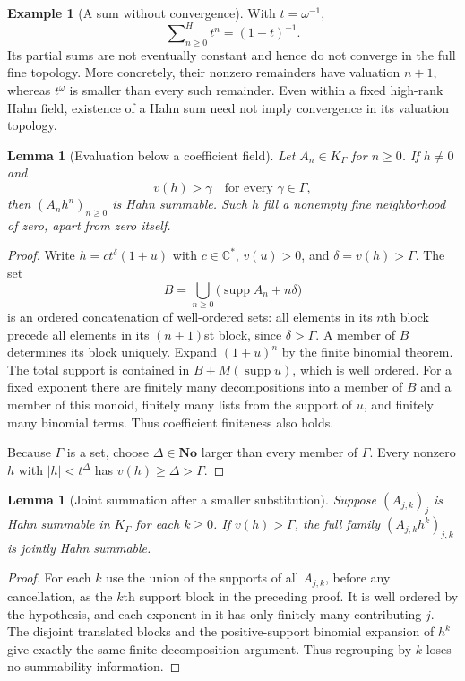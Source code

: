 \documentclass[11pt,a4paper]{article}
\newtheorem{lemma}[theorem]{Lemma}
\theoremstyle{definition}
\newtheorem{example}[theorem]{Example}
\theoremstyle{remark}
\newcommand{\No}{\mathbf{No}}
\newcommand{\C}{\mathbb C}
\newcommand{\supp}{\operatorname{supp}}
\newcommand{\Hs}{\mathop{\sum}\nolimits^{\!H}}
\begin{document}
\begin{example}[A sum without convergence]
With $t=\omega^{-1}$,
\[
 \Hs_{n\ge0}t^n=(1-t)^{-1}.
\]
Its partial sums are not eventually constant and hence do not converge
in the full fine topology. More concretely, their nonzero remainders
have valuation $n+1$, whereas $t^\omega$ is smaller than every such
remainder. Even within a fixed high-rank Hahn field, existence of a
Hahn sum need not imply convergence in its valuation topology.
\end{example}

\begin{lemma}[Evaluation below a coefficient field]\label{lem:ultrasmall}
Let $A_n\in K_\Gamma$ for $n\ge0$. If $h\ne0$ and
\[
 v(h)>\gamma\quad\text{for every }\gamma\in\Gamma,
\]
then $(A_nh^n)_{n\ge0}$ is Hahn summable. Such $h$ fill a nonempty
fine neighborhood of zero, apart from zero itself.
\end{lemma}
\begin{proof}
Write $h=c t^\delta(1+u)$ with $c\in\C^*$, $v(u)>0$, and
$\delta=v(h)>\Gamma$. The set
\[
 B=\bigcup_{n\ge0}\bigl(\supp A_n+n\delta\bigr)
\]
is an ordered concatenation of well-ordered sets: all elements in its
$n$th block precede all elements in its $(n+1)$st block, since
$\delta>\Gamma$. A member of $B$ determines its block uniquely.
Expand $(1+u)^n$ by the finite binomial theorem. The total support is
contained in $B+M(\supp u)$, which is well ordered. For a fixed
exponent there are finitely many decompositions into a member of $B$
and a member of this monoid, finitely many lists from the support of
$u$, and finitely many binomial terms. Thus coefficient finiteness
also holds.

Because $\Gamma$ is a set, choose $\Delta\in\No$ larger than every
member of $\Gamma$. Every nonzero $h$ with $|h|<t^\Delta$ has
$v(h)\ge\Delta>\Gamma$.
\end{proof}
\begin{lemma}[Joint summation after a smaller substitution]\label{lem:jointsmall}
Suppose $(A_{j,k})_j$ is Hahn summable in $K_\Gamma$ for each
$k\ge0$. If $v(h)>\Gamma$, the full family
$(A_{j,k}h^k)_{j,k}$ is jointly Hahn summable.
\end{lemma}
\begin{proof}
For each $k$ use the union of the supports of all $A_{j,k}$, before
any cancellation, as the $k$th support block in the preceding proof.
It is well ordered by the hypothesis, and each exponent in it has
only finitely many contributing $j$. The disjoint translated blocks
and the positive-support binomial expansion of $h^k$ give exactly the
same finite-decomposition argument. Thus regrouping by $k$ loses no
summability information.
\end{proof}
\end{document}
